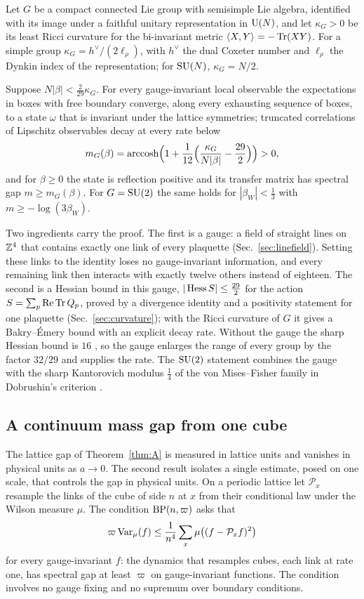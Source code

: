 Let $G$ be a compact connected Lie group with semisimple Lie algebra,
identified with its image under a faithful unitary representation in $\mathrm{U}(N)$,
and let $\kappa_G>0$ be its least Ricci curvature for the bi-invariant metric
$\langle X,Y\rangle=-\operatorname{Tr}(XY)$. For a simple group $\kappa_G=h^\vee/(2\ell_\rho)$, with $h^\vee$
the dual Coxeter number and $\ell_\rho$ the Dynkin index of the representation;
for $\mathrm{SU}(N)$, $\kappa_G=N/2$.

\begin{mainthm}\label{thm:A}
Suppose $N|\beta|<\frac2{29}\kappa_G$. For every gauge-invariant local
observable the expectations in boxes with free boundary converge, along every
exhausting sequence of boxes, to a state $\omega$ that is invariant under the
lattice symmetries; truncated correlations of Lipschitz observables decay at
every rate below
\[
m_G(\beta)=\operatorname{arccosh}\Bigl(1+\frac1{12}\Bigl(\frac{\kappa_G}{N|\beta|}
-\frac{29}2\Bigr)\Bigr)>0 ,
\]
and for $\beta\ge0$ the state is reflection positive and its transfer matrix
has spectral gap $m\ge m_G(\beta)$. For $G=\mathrm{SU}(2)$ the same holds for
$|\beta_W|<\frac13$ with $m\ge-\log(3\beta_W)$.
\end{mainthm}

Two ingredients carry the proof. The first is a gauge: a field of straight
lines on $\mathbb{Z}^4$ that contains exactly one link of every plaquette
(Sec.~\ref{sec:linefield}). Setting these links to the identity loses no
gauge-invariant information, and every remaining link then interacts with
exactly twelve others instead of eighteen. The second is a Hessian bound in
this gauge, $|\operatorname{Hess} S|\le\frac{29}2$ for the action $S=\sum_p\operatorname{Re}\operatorname{Tr} Q_p$, proved
by a divergence identity and a positivity statement for one plaquette
(Sec.~\ref{sec:curvature}); with the Ricci curvature of $G$ it gives a
Bakry--\'Emery bound \cite{BE85,BGL14} with an explicit decay rate. Without
the gauge the sharp Hessian bound is $16$ \cite{BB26a}, so the gauge enlarges
the range of every group by the factor $32/29$ and supplies the rate. The
$\mathrm{SU}(2)$ statement combines the gauge with the sharp Kantorovich modulus
$\frac14$ of the von Mises--Fisher family \cite{BB26a} in Dobrushin's
criterion \cite{Dob68,Dob70}.

\subsection{A continuum mass gap from one cube}

The lattice gap of Theorem~\ref{thm:A} is measured in lattice units and
vanishes in physical units as $a\to0$. The second result isolates a single
estimate, posed on one scale, that controls the gap in physical units. On a
periodic lattice let $\mathcal P_x$ resample the links of the cube of side $n$
at $x$ from their conditional law under the Wilson measure $\mu$. The
condition $\mathrm{BP}(n,\varpi)$ asks that
\[
\varpi\operatorname{Var}_\mu(f)\le\frac1{n^4}\sum_x\mu\bigl((f-\mathcal P_xf)^2\bigr)
\]
for every gauge-invariant $f$: the dynamics that resamples cubes, each link
at rate one, has spectral gap at least $\varpi$ on gauge-invariant functions.
The condition involves no gauge fixing and no supremum over boundary
conditions.

